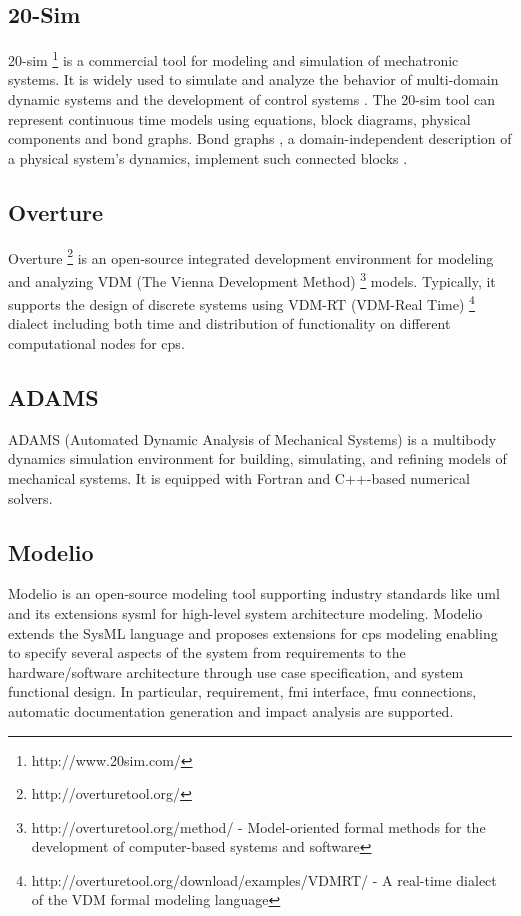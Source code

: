 \subsection{20-Sim}
\label{susec:20sim}


20-sim \footnote{http://www.20sim.com/} is a commercial tool for modeling and simulation of mechatronic systems. It  is widely used to simulate and analyze the behavior of multi-domain dynamic systems and the development of control systems \cite{20sim,20simduindam,20simjan}. The 20-sim tool can represent continuous time models using equations, block diagrams, physical components and bond graphs. Bond graphs \cite{20simgawthrop}, a domain-independent description of a physical system's dynamics, implement such connected blocks . 


\subsection{Overture}
\label{sec:overture}

Overture \footnote{http://overturetool.org/} is an open-source integrated development environment for modeling and analyzing VDM (The Vienna Development Method) \footnote{http://overturetool.org/method/ - Model-oriented formal methods for the development of computer-based systems and software} models. Typically, it supports \cite{overtureverhoef} the design of discrete systems using VDM-RT (VDM-Real Time) \footnote{http://overturetool.org/download/examples/VDMRT/ - A real-time dialect of the VDM formal modeling language} dialect including both time and distribution of functionality on different computational nodes for \acrshort{cps}.


\subsection{ADAMS}
\label{sec:adams}

ADAMS (Automated Dynamic Analysis of Mechanical Systems) \cite{adams} is a multibody dynamics simulation environment for building, simulating, and refining models of mechanical systems. It is equipped with Fortran and C++-based numerical solvers. 

\subsection{Modelio}
\label{sec:modelio}

Modelio \cite{modelio} is an open-source modeling tool supporting industry standards like \acrshort{uml} and its extensions \acrshort{sysml} for high-level system architecture modeling. Modelio extends the SysML language \cite{sysml, sysmlmorgan} and proposes extensions for \acrshort{cps} modeling enabling to specify several aspects of the system from requirements to the hardware/software architecture through use case specification, and system functional design. In particular, requirement, \acrshort{fmi} interface, \acrshort{fmu} connections, automatic documentation generation and impact analysis are supported. 

